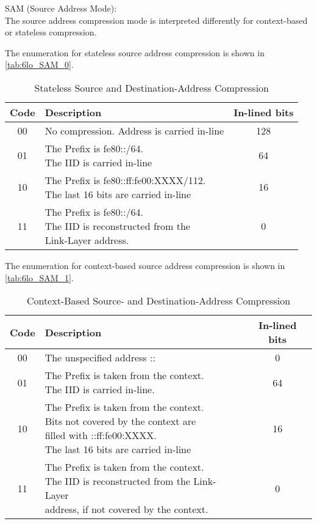 SAM (Source Address Mode):\\
The source address compression mode is interpreted differently for context-based or stateless compression.

The enumeration for stateless source address compression is shown in \autoref{tab:6lo_SAM_0}.
\begin{table}[h!]
	\centering
	\caption{Stateless Source and Destination-Address Compression}
	\begin{tabular}{|c|l|c|} \hline
	Code & Description                                           & In-lined bits\\ \hline \hline
	00   & No compression. Address is carried in-line            & 128 \\ \hline
	01   & \makecell[l]{The Prefix is fe80::/64.\\
	                    The IID is carried in-line}              & 64  \\ \hline
	10   & \makecell[l]{The Prefix is fe80::ff:fe00:XXXX/112.\\
	                    The last 16 bits are carried in-line}    & 16  \\ \hline
	11   & \makecell[l]{The Prefix is fe80::/64.\\
			    The IID is reconstructed from the\\
			    Link-Layer address.}                     & 0   \\ \hline
	\end{tabular}
	\label{tab:6lo_SAM_0}
\end{table}

The enumeration for context-based source address compression is shown in \autoref{tab:6lo_SAM_1}.
\begin{table}[h!]
	\centering
	\caption{Context-Based Source- and Destination-Address Compression}
	\begin{tabular}{|c|l|c|} \hline
	Code & Description                                                  & In-lined bits\\ \hline \hline
	00   & The unspecified address ::                                   & 0  \\ \hline
	01   & \makecell[l]{The Prefix is taken from the context. \\
	                    The IID is carried in-line.}                    & 64 \\ \hline
	10   & \makecell[l]{The Prefix is taken from the context. \\
			    Bits not covered by the context are \\
			    filled with ::ff:fe00:XXXX.\\
			    The last 16 bits are carried in-line}           & 16 \\ \hline
	11   & \makecell[l]{The Prefix is taken from the context.\\
			    The IID is reconstructed from the Link-Layer \\
			    address, if not covered by the context.}        & 0 \\ \hline
	\end{tabular}
	\label{tab:6lo_SAM_1}
\end{table}

